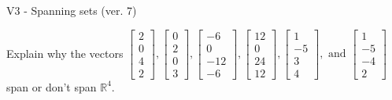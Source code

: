 \begin{exercise}
  \begin{exerciseTitle}V3 - Spanning sets (ver. 7)\end{exerciseTitle}
  \begin{exerciseStatement}
    Explain why the vectors \(\left[\begin{array}{r}
2 \\
0 \\
4 \\
2
\end{array}\right] , \left[\begin{array}{r}
0 \\
2 \\
0 \\
3
\end{array}\right] , \left[\begin{array}{r}
-6 \\
0 \\
-12 \\
-6
\end{array}\right] , \left[\begin{array}{r}
12 \\
0 \\
24 \\
12
\end{array}\right] , \left[\begin{array}{r}
1 \\
-5 \\
3 \\
4
\end{array}\right] , \text{ and } \left[\begin{array}{r}
1 \\
-5 \\
-4 \\
2
\end{array}\right]\) span or don't span \(\mathbb{R}^4\). 
	



\end{exerciseStatement}
\end{exercise}
